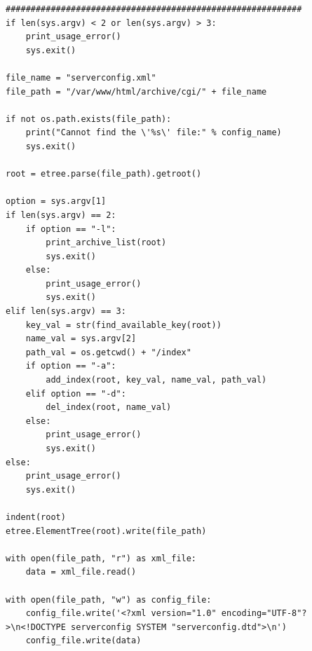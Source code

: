 \documentclass[11pt
  , a4paper
  , article
  , oneside
]{memoir}
\begin{document}
\begin{lstlisting}[style=termstylenumber, caption={DataServerConfig.py}]
###########################################################
if len(sys.argv) < 2 or len(sys.argv) > 3:
    print_usage_error()
    sys.exit()

file_name = "serverconfig.xml"
file_path = "/var/www/html/archive/cgi/" + file_name

if not os.path.exists(file_path):
    print("Cannot find the \'%s\' file:" % config_name)
    sys.exit()

root = etree.parse(file_path).getroot()

option = sys.argv[1]
if len(sys.argv) == 2:
    if option == "-l":
        print_archive_list(root)
        sys.exit()
    else:
        print_usage_error()
        sys.exit()
elif len(sys.argv) == 3:
    key_val = str(find_available_key(root))
    name_val = sys.argv[2]
    path_val = os.getcwd() + "/index"
    if option == "-a":
        add_index(root, key_val, name_val, path_val)
    elif option == "-d":
        del_index(root, name_val)
    else:
        print_usage_error()
        sys.exit()
else:
    print_usage_error()
    sys.exit()

indent(root)
etree.ElementTree(root).write(file_path)

with open(file_path, "r") as xml_file:
    data = xml_file.read()

with open(file_path, "w") as config_file:
    config_file.write('<?xml version="1.0" encoding="UTF-8"?>\n<!DOCTYPE serverconfig SYSTEM "serverconfig.dtd">\n')
    config_file.write(data)
\end{lstlisting}
\end{document}
